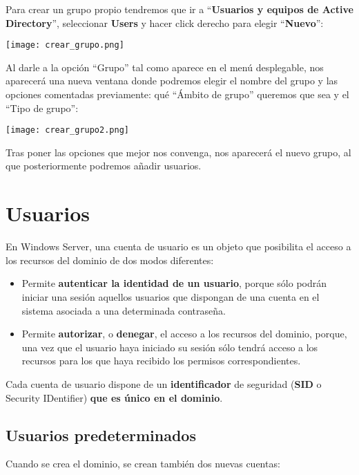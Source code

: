 Para crear un grupo propio tendremos que ir a “\textbf{Usuarios y equipos de Active Directory}”, seleccionar \textbf{Users} y hacer click derecho para elegir “\textbf{Nuevo}”:

\begin{center}
    \vspace{-10pt}
    \texttt{[image: crear\_grupo.png]}
    \vspace{-10pt}
\end{center}

Al darle a la opción “Grupo” tal como aparece en el menú desplegable, nos aparecerá una nueva ventana donde podremos elegir el nombre del grupo y las opciones comentadas previamente: qué “Ámbito de grupo” queremos que sea y el “Tipo de grupo”:

\begin{center}
    \vspace{-10pt}
    \texttt{[image: crear\_grupo2.png]}
    \vspace{-10pt}
\end{center}

Tras poner las opciones que mejor nos convenga, nos aparecerá el nuevo grupo, al que posteriormente podremos añadir usuarios.

\section{Usuarios}
En Windows Server, una cuenta de usuario es un objeto que posibilita el acceso a los recursos del dominio de dos modos diferentes:

\begin{itemize}
    \item Permite \textbf{autenticar la identidad de un usuario}, porque sólo podrán iniciar una sesión aquellos usuarios que dispongan de una cuenta en el sistema asociada a una determinada contraseña.
    \item Permite \textbf{autorizar}, o \textbf{denegar}, el acceso a los recursos del dominio, porque, una vez que el usuario haya iniciado su sesión sólo tendrá acceso a los recursos para los que haya recibido los permisos correspondientes.
\end{itemize}

Cada cuenta de usuario dispone de un \textbf{identificador} de seguridad (\textbf{SID} o Security IDentifier) \textbf{que es único en el dominio}.


\subsection{Usuarios predeterminados}
Cuando se crea el dominio, se crean también dos nuevas cuentas:

